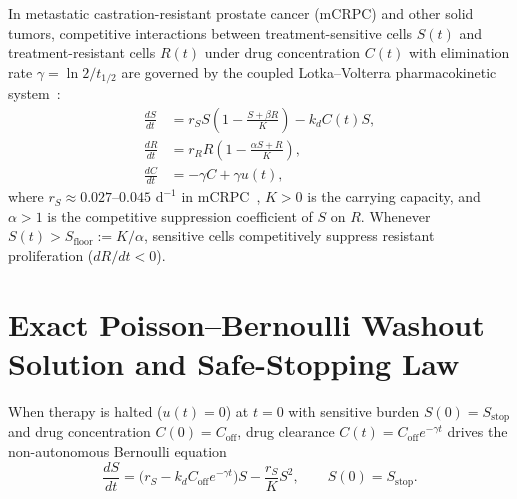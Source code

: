 \documentclass[11pt,reqno]{article}
\begin{document}
In metastatic castration-resistant prostate cancer (mCRPC) and other solid tumors, competitive interactions between treatment-sensitive cells $S(t)$ and treatment-resistant cells $R(t)$ under drug concentration $C(t)$ with elimination rate $\gamma = \ln 2 / t_{1/2}$ are governed by the coupled Lotka--Volterra pharmacokinetic system~\cite{Zhang2017,BradyNicholls2020}:
\begin{align}
\frac{dS}{dt} &= r_S S\left(1 - \frac{S + \beta R}{K}\right) - k_d C(t) S, \label{eq:S}\\
\frac{dR}{dt} &= r_R R\left(1 - \frac{\alpha S + R}{K}\right), \label{eq:R}\\
\frac{dC}{dt} &= -\gamma C + \gamma u(t), \label{eq:C}
\end{align}
where $r_S \approx 0.027\text{--}0.045\text{ d}^{-1}$ in mCRPC~\cite{BradyNicholls2020}, $K > 0$ is the carrying capacity, and $\alpha > 1$ is the competitive suppression coefficient of $S$ on $R$. Whenever $S(t) > S_{\mathrm{floor}} := K/\alpha$, sensitive cells competitively suppress resistant proliferation ($dR/dt < 0$).

\section{Exact Poisson--Bernoulli Washout Solution and Safe-Stopping Law}

When therapy is halted ($u(t)=0$) at $t=0$ with sensitive burden $S(0)=S_{\mathrm{stop}}$ and drug concentration $C(0)=C_{\mathrm{off}}$, drug clearance $C(t)=C_{\mathrm{off}}e^{-\gamma t}$ drives the non-autonomous Bernoulli equation
\begin{equation}\label{eq:bernoulli}
\frac{dS}{dt} = \big(r_S - k_d C_{\mathrm{off}}e^{-\gamma t}\big)S - \frac{r_S}{K}S^2, \qquad S(0) = S_{\mathrm{stop}}.
\end{equation}
\end{document}
